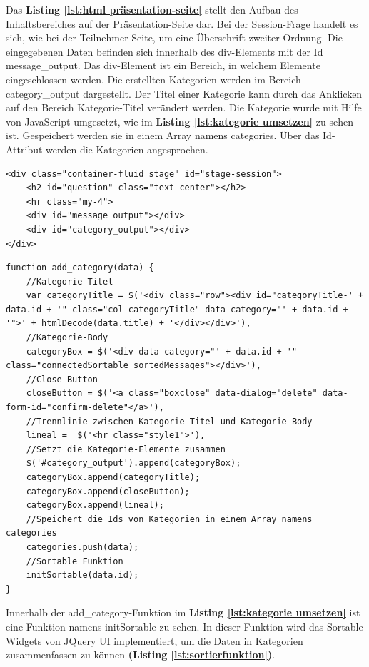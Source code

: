 \newpage
Das \textbf{Listing \ref{lst:html präsentation-seite}} stellt den Aufbau des Inhaltsbereiches auf der Präsentation-Seite dar. Bei der Session-Frage handelt es sich, wie bei der Teilnehmer-Seite, um eine Überschrift zweiter Ordnung. Die eingegebenen Daten befinden sich innerhalb des div-Elements mit der Id \glqq message\_output\grqq{}. Das div-Element ist ein Bereich, in welchem Elemente eingeschlossen werden. Die erstellten Kategorien werden im Bereich \glqq category\_output\grqq{} dargestellt. Der Titel einer Kategorie kann durch das Anklicken auf den Bereich \glqq Kategorie-Titel\grqq{} verändert werden. Die Kategorie wurde mit Hilfe von JavaScript umgesetzt, wie im \textbf{Listing \ref{lst:kategorie umsetzen}} zu sehen ist. Gespeichert werden sie in einem Array namens \glqq categories\grqq{}. Über das Id-Attribut werden die Kategorien angesprochen.\bigskip

\begin{lstlisting}[caption={HTML-Struktur der Präsentation-Seite}, label=lst:html präsentation-seite, captionpos=b]
<div class="container-fluid stage" id="stage-session">
	<h2 id="question" class="text-center"></h2>
    <hr class="my-4">
    <div id="message_output"></div>
    <div id="category_output"></div>
</div>

\end{lstlisting}
\bigskip

\begin{lstlisting}[caption={Kategorie umsetzen - JavaScript}, label=lst:kategorie umsetzen, captionpos=b]
function add_category(data) {
	//Kategorie-Titel
	var categoryTitle = $('<div class="row"><div id="categoryTitle-' + data.id + '" class="col categoryTitle" data-category="' + data.id + '">' + htmlDecode(data.title) + '</div></div>'),
	//Kategorie-Body
	categoryBox = $('<div data-category="' + data.id + '" class="connectedSortable sortedMessages"></div>'),
	//Close-Button
	closeButton = $('<a class="boxclose" data-dialog="delete" data-form-id="confirm-delete"</a>'),
	//Trennlinie zwischen Kategorie-Titel und Kategorie-Body
	lineal =  $('<hr class="style1">'),
	//Setzt die Kategorie-Elemente zusammen
	$('#category_output').append(categoryBox);
	categoryBox.append(categoryTitle);
	categoryBox.append(closeButton);
	categoryBox.append(lineal);
	//Speichert die Ids von Kategorien in einem Array namens categories
	categories.push(data);
	//Sortable Funktion
	initSortable(data.id);
}
\end{lstlisting}
\bigskip

Innerhalb der \glqq add\_category\grqq{}-Funktion im \textbf{Listing \ref{lst:kategorie umsetzen}} ist eine Funktion namens \glqq initSortable\grqq{} zu sehen. In dieser Funktion wird das Sortable Widgets von JQuery UI implementiert, um die Daten in Kategorien zusammenfassen zu können \textbf{(Listing \ref{lst:sortierfunktion})}.\bigskip

